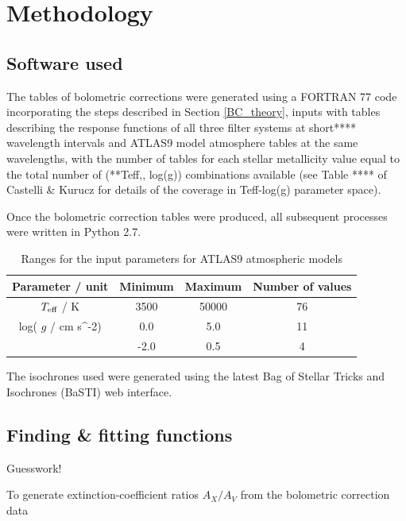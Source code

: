 \documentclass[12pt, a4paper]{report}
\begin{document}
\chapter{Methodology}
\section{Software used}

The tables of bolometric corrections were generated using a FORTRAN 77 code incorporating the steps described in Section \ref{BC_theory}, inputs with tables describing the response functions of all three filter systems at short**** wavelength intervals and ATLAS9 model atmosphere tables at the same wavelengths, with the number of tables for each stellar metallicity value equal to the total number of (**Teff,, log(g)) combinations available (see Table **** of Castelli & Kurucz for details of the coverage in Teff-log(g) parameter space).

Once the bolometric correction tables were produced, all subsequent processes were written in Python 2.7.

\begin{table}
\begin{center}
\begin{tabular}{cccc}
\hline
Parameter / unit & Minimum & Maximum & Number of values \\
\hline
$T_{\textnormal{eff}}$ / K & 3500 & 50000 & 76 \\
log( $g$ / cm s^-2) & 0.0 & 5.0 & 11 \\
[Fe/H] & -2.0 & 0.5 & 4 \\
\hline
\end{tabular}
\caption{Ranges for the input parameters for ATLAS9 atmospheric models}
\label{atlas9_input}
\end{center}
\end{table}


The isochrones used were generated using the latest Bag of Stellar Tricks and Isochrones (BaSTI) web interface.
\section{Finding \& fitting functions}
Guesswork!

To generate extinction-coefficient ratios $A_{X}/A_{V}$ from the bolometric correction data
\end{document}
